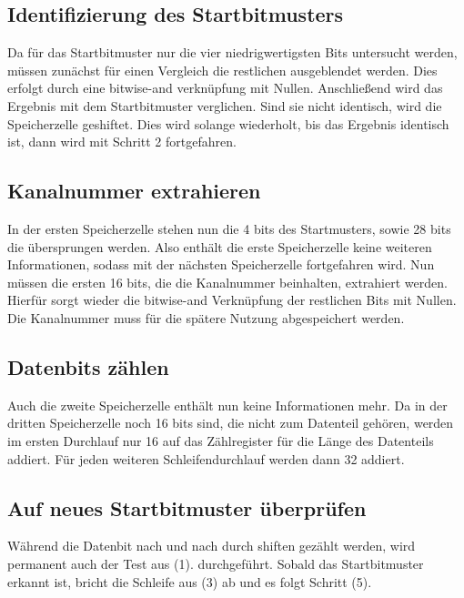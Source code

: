 \documentclass[12pt,titlepage,german,a4]{article}
\begin{document}
    \subsection{Identifizierung des Startbitmusters}
    Da f{\"u}r das Startbitmuster nur die vier niedrigwertigsten Bits untersucht werden, m{\"u}ssen zun{\"a}chst f{\"u}r einen Vergleich die restlichen ausgeblendet werden. Dies erfolgt durch eine bitwise-and verkn{\"u}pfung mit Nullen. Anschließend wird das Ergebnis mit dem Startbitmuster verglichen. Sind sie nicht identisch, wird die Speicherzelle geshiftet. Dies wird solange wiederholt, bis das Ergebnis identisch ist, dann wird mit Schritt 2 fortgefahren.

    \subsection{Kanalnummer extrahieren}
    In der ersten Speicherzelle stehen nun die 4 bits des Startmusters, sowie 28 bits die {\"u}bersprungen werden. Also enth{\"a}lt die erste Speicherzelle keine weiteren Informationen, sodass mit der n{\"a}chsten Speicherzelle fortgefahren wird. Nun m{\"u}ssen die ersten 16 bits, die die Kanalnummer beinhalten, extrahiert werden. Hierf{\"u}r sorgt wieder die bitwise-and Verkn{\"u}pfung der restlichen Bits mit Nullen. Die Kanalnummer muss f{\"u}r die sp{\"a}tere Nutzung abgespeichert werden.

    \subsection{Datenbits z{\"a}hlen}
    Auch die zweite Speicherzelle enth{\"a}lt nun keine Informationen mehr. Da in der dritten Speicherzelle noch 16 bits sind, die nicht zum Datenteil geh{\"o}ren, werden im ersten Durchlauf nur 16 auf das Z{\"a}hlregister f{\"u}r die L{\"a}nge des Datenteils addiert. F{\"u}r jeden weiteren Schleifendurchlauf werden dann 32 addiert.

    \subsection{Auf neues Startbitmuster {\"u}berpr{\"u}fen}
    W{\"a}hrend die Datenbit nach und nach durch shiften gez{\"a}hlt werden, wird permanent auch der Test aus (1). durchgef{\"u}hrt. Sobald das Startbitmuster erkannt ist, bricht die Schleife aus (3) ab und es folgt Schritt (5).
\end{document}

